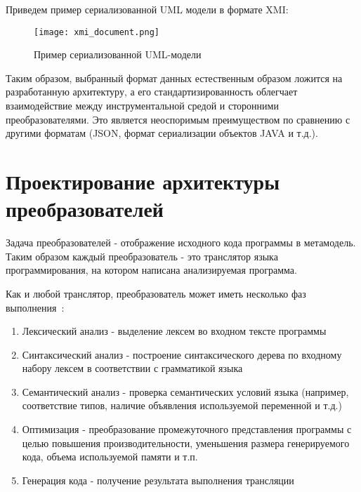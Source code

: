 Приведем пример сериализованной UML модели в формате XMI:

\begin{figure}[ht]
    \begin{center}
        \texttt{[image: xmi\_document.png]}
    \end{center}
    \caption{Пример сериализованной UML-модели}
    \label{fig:xmi_document}
\end{figure}

Таким образом, выбранный формат данных естественным образом ложится на
разработанную архитектуру, а его стандартизированность облегчает взаимодействие
между инструментальной средой и сторонними преобразователями. Это является
неоспоримым преимуществом по сравнению с другими форматам (JSON, формат
сериализации объектов JAVA и т.д.).

\section{Проектирование архитектуры преобразователей}

Задача преобразователей - отображение исходного кода программы в метамодель.
Таким образом каждый преобразователь - это транслятор языка программирования, на
котором написана анализируемая программа.

Как и любой транслятор, преобразователь может иметь несколько фаз
выполнения~\cite{Aho1986}:

\begin{enumerate}
    \item Лексический анализ - выделение лексем во входном тексте программы
    \item Синтаксический анализ - построение синтаксического дерева по входному
    набору лексем в соответствии с грамматикой языка
    \item Семантический анализ - проверка семантических условий языка (например,
    соответствие типов, наличие объявления используемой переменной и т.д.)
    \item Оптимизация - преобразование промежуточного представления программы
    с целью повышения производительности, уменьшения размера генерируемого кода,
    объема используемой памяти и т.п.
    \item Генерация кода - получение результата выполнения трансляции
\end{enumerate}

